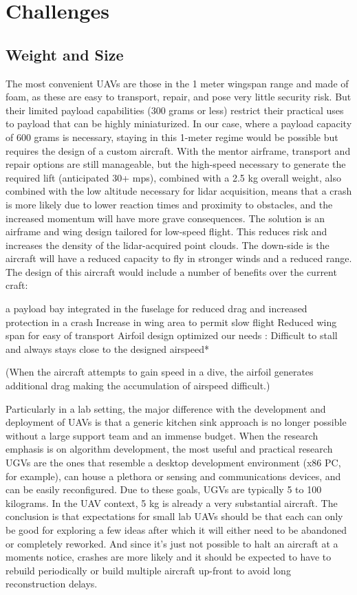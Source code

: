 \documentclass[a4paper,11pt]{report}
\begin{document}
\section{Challenges}

\subsection{Weight and Size}

The most convenient UAVs are those in the 1 meter wingspan range and made of foam, as these are easy to transport, repair, and pose very little security risk. But their limited payload capabilities (300 grams or less) restrict their practical uses to payload that can be highly miniaturized. In our case, where a payload capacity of 600 grams is necessary, staying in this 1-meter regime would be possible but requires the design of a custom aircraft. With the mentor airframe, transport and repair options are still manageable, but the high-speed necessary to generate the required lift (anticipated 30+ mps), combined with a 2.5 kg overall weight, also combined with the low altitude necessary for lidar acquisition, means that a crash is more likely due to lower reaction times and proximity to obstacles, and the increased momentum will have more grave consequences. The solution is an airframe and wing design tailored for low-speed flight. This reduces risk and increases the density of the lidar-acquired point clouds. The down-side is the aircraft will have a reduced capacity to fly in stronger winds and a reduced range. The design of this aircraft would include a number of benefits over the current craft: 

a payload bay integrated in the fuselage for reduced drag and increased protection in a crash
Increase in wing area to permit slow flight
Reduced wing span for easy of transport
Airfoil design optimized our needs : Difficult to stall and always stays close to the designed airspeed*

(When the aircraft attempts to gain speed in a dive, the airfoil generates additional drag making the accumulation of airspeed difficult.)

Particularly in a lab setting, the major difference with the development and deployment of UAVs is that a generic kitchen sink approach is no longer possible without a large support team and an immense budget. When the research emphasis is on algorithm development, the most useful and practical research UGVs are the ones that resemble a desktop development environment (x86 PC, for example), can house a plethora or sensing and communications devices, and can be easily reconfigured. Due to these goals, UGVs are typically 5 to 100 kilograms. In the UAV context, 5 kg is already a very substantial aircraft. The conclusion is that expectations for small lab UAVs should be that each can only be good for exploring a few ideas after which it will either need to be abandoned or completely reworked. And since it's just not possible to halt an aircraft at a moments notice, crashes are more likely and it should be expected to have to rebuild periodically or build multiple aircraft up-front to avoid long reconstruction delays.
\end{document}

